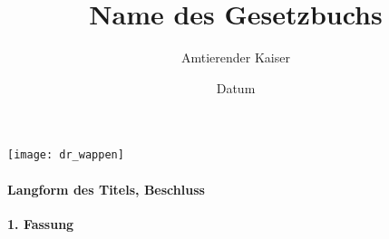 \documentclass{article}
\title{Name des Gesetzbuchs}
\author{Amtierender Kaiser}
\date{Datum}
\begin{document}
\maketitle
\begin{center}
    \texttt{[image: dr\_wappen]}
\end{center}
\vspace*{\fill}
\paragraph{Langform des Titels, Beschluss}

\newpage
{}
\vspace*{\fill}
\begin{Center}
\textbf{1. Fassung}
\vspace*{\fill}
\end{Center}
\newpage
\tableofcontents
\newpage

\end{document}
